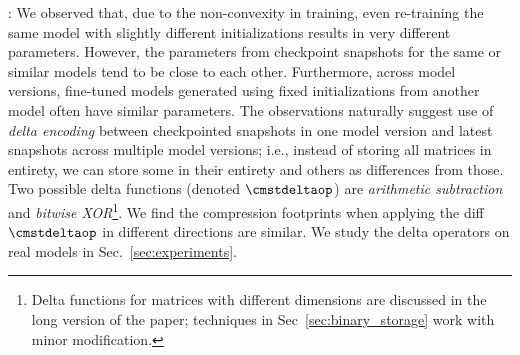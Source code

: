\documentclass[conference]{IEEEtran}
\begin{document}



: 
We observed that, due to the non-convexity in training, even re-training the
same model with slightly different initializations results in very different
parameters. %
However, the parameters from checkpoint snapshots for the same
or similar models tend to be close to each other. 
%
Furthermore, across model versions, fine-tuned models generated using fixed
initializations from another model often have similar parameters. The
observations naturally suggest use of {\em delta encoding} between checkpointed snapshots
in one model version and latest snapshots across multiple model versions; i.e., instead of storing
all matrices in entirety, we can store some in their entirety and others as differences from those.
Two possible delta functions (denoted $\cmstdeltaop$) are {\em arithmetic subtraction} and {\em bitwise XOR}\footnote{
Delta functions for matrices with different dimensions are discussed in the long version of the paper; 
techniques in
Sec~\ref{sec:binary_storage} work with minor modification.}. %
We find the compression footprints when applying
the diff $\cmstdeltaop$ in different directions are similar.
We study the delta operators on real models in Sec.~\ref{sec:experiments}. 
\end{document}
